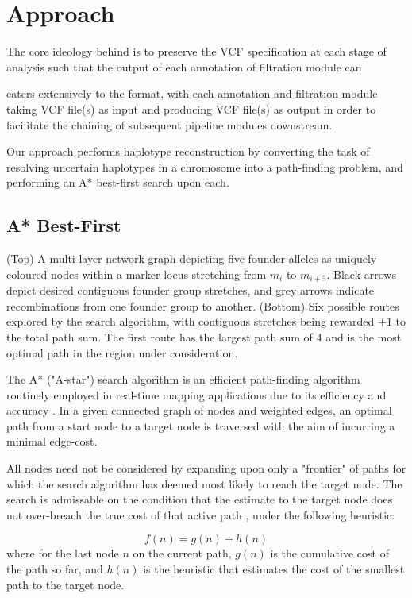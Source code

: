 
\section{Approach}

The core ideology behind \app is to preserve the VCF specification at each stage of analysis such that the output of each annotation of filtration module can 



\app caters extensively to the format, with each annotation and filtration module taking VCF file(s) as input and producing VCF file(s) as output in order to facilitate the chaining of subsequent pipeline modules downstream.


Our approach performs haplotype reconstruction by converting the task of resolving uncertain haplotypes in a chromosome into a path-finding problem, and performing an A* best-first search upon each.

\subsection{A* Best-First}

	{(Top) A multi-layer network graph depicting five founder alleles as uniquely coloured nodes within a marker locus stretching from $m_i$ to $m_{i+5}$. Black arrows depict desired contiguous founder group stretches, and grey arrows indicate recombinations from one founder group to another. (Bottom) Six possible routes explored by the search algorithm, with contiguous stretches being rewarded $+1$ to the total path sum. The first route has the largest path sum of 4 and is the most optimal path in the region under consideration.}

The A* ("A-star") search algorithm is an efficient path-finding algorithm routinely employed in real-time mapping applications due to its efficiency and accuracy \citep{stout1996smart,seet2004star}. In a given connected graph of nodes and weighted edges, an optimal path from a start node to a target node is traversed with the aim of incurring a minimal edge-cost. 

All nodes need not be considered by expanding upon only a "frontier" of paths for which the search algorithm has deemed most likely to reach the target node. The search is admissable on the condition that the estimate to the target node does not over-breach the true cost of that active path \citep{astar}, under the following heuristic:

\begin{equation}
f(n) = g(n) + h(n)
\end{equation}
where for the last node $n$ on the current path, $g(n)$ is the cumulative cost of the path so far, and $h(n)$ is the heuristic that estimates the cost of the smallest path to the target node.

